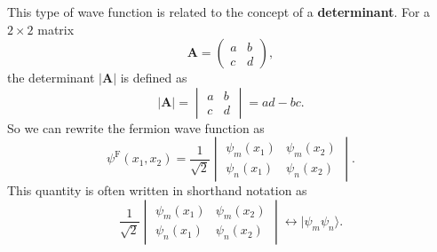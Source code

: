 \documentclass[../Main/chem331-notes.tex]{subfiles}
\begin{document}
This type of wave function is related to the concept of a \textbf{determinant}.
For a $2 \times 2$ matrix 
\begin{equation}
\mathbf{A} = 
\begin{pmatrix}
a & b \\
c & d
\end{pmatrix},
\end{equation}
the determinant $|\mathbf{A}|$ is defined as
\begin{equation}
|\mathbf{A}| = 
\begin{vmatrix}
a & b \\
c & d
\end{vmatrix}
=ad - bc.
\end{equation}
So we can rewrite the fermion wave function as
\begin{equation}
\psi^\mathrm{F}(x_1,x_2) = \frac{1}{\sqrt{2}}
\begin{vmatrix}
\psi_m(x_1) & \psi_m(x_2) \\
\psi_n(x_1) & \psi_n(x_2)
\end{vmatrix}.
\end{equation}
This quantity is often written in shorthand notation as
\begin{equation}
 \frac{1}{\sqrt{2}}
\begin{vmatrix}
\psi_m(x_1) & \psi_m(x_2) \\
\psi_n(x_1) & \psi_n(x_2)
\end{vmatrix} \leftrightarrow | \psi_m \psi_n \rangle.
\end{equation}
\end{document}

